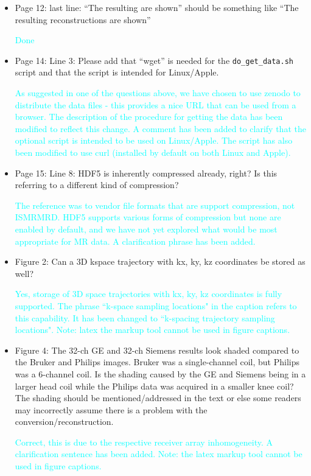 \documentclass[12pt, draft]{article}
\makeatletter
\def\namedlabel#1#2{\begingroup#2\def\@currentlabel{#2}\phantomsection\label{#1}\endgroup}
\newcommand{\question}[1]{\item[\namedlabel{q#1}{#1}]}
\newcommand{\response}[1]{\textcolor{cyan}{#1}}
\makeatother
\begin{document}
{\begin{itemize}
\question{R2.25} Page 12: last line: ``The resulting are shown'' should be something like ``The resulting reconstructions are shown''

\response{Done}

\question{R2.26} Page 14: Line 3: Please add that ``wget'' is needed for the \texttt{do\_get\_data.sh} script and that the script is intended for Linux/Apple.

\response{As suggested in one of the questions above, we have chosen to use zenodo to distribute the data files - this provides a nice URL that can be used from a browser.  The description of the procedure for getting the data has been modified to reflect this change.  A comment has been added to clarify that the optional script is intended to be used on Linux/Apple.  The script has also been modified to use curl (installed by default on both Linux and Apple).}

\question{R2.27} Page 15: Line 8: HDF5 is inherently compressed already, right? Is this referring to a different kind of compression?

\response{The reference was to vendor file formats that are support compression, not ISMRMRD. HDF5 supports various forms of compression but none are enabled by default, and we have not yet explored what would be most appropriate for MR data.  A clarification phrase has been added.}

\question{R2.28} Figure 2: Can a 3D kspace trajectory with kx, ky, kz coordinates be stored as well?

\response{Yes, storage of 3D space trajectories with kx, ky, kz coordinates is fully supported.  The phrase ``k-space sampling locations" in the caption refers to this capability.  It has been changed to ``k-spacing trajectory sampling locations".  Note: latex the markup tool cannot be used in figure captions.}

\question{R2.29} Figure 4: The 32-ch GE and 32-ch Siemens results look shaded compared to the Bruker and Philips images. Bruker was a single-channel coil, but Philips was a 6-channel coil. Is the shading caused by the GE and Siemens being in a larger head coil while the Philips data was acquired in a smaller knee coil? The shading should be mentioned/addressed in the text or else some readers may incorrectly assume there is a problem with the conversion/reconstruction.

\response{Correct, this is due to the respective receiver array inhomogeneity. A clarification sentence has been added. Note: the latex markup tool cannot be used in figure captions.}

\end{itemize}

\listofchanges

}%
\end{document}
